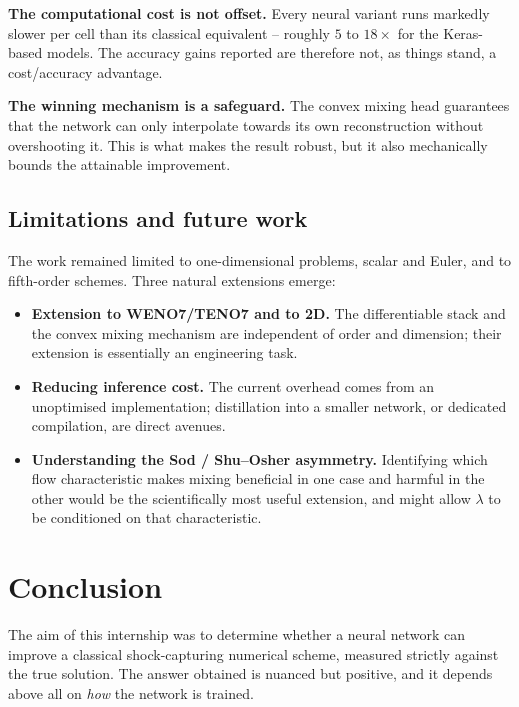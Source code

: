 \documentclass[12pt,a4paper,oneside]{report}
\begin{document}
\textbf{The computational cost is not offset.} Every neural variant runs
markedly slower per cell than its classical equivalent -- roughly $5$ to
$18\times$ for the Keras-based models. The accuracy gains reported are
therefore not, as things stand, a cost/accuracy advantage.

\textbf{The winning mechanism is a safeguard.} The convex mixing head
guarantees that the network can only interpolate towards its own reconstruction
without overshooting it. This is what makes the result robust, but it also
mechanically bounds the attainable improvement.

\section{Limitations and future work}

The work remained limited to one-dimensional problems, scalar and Euler, and to
fifth-order schemes. Three natural extensions emerge:

\begin{itemize}
  \item \textbf{Extension to WENO7/TENO7 and to 2D.} The differentiable stack
  and the convex mixing mechanism are independent of order and dimension; their
  extension is essentially an engineering task.
  \item \textbf{Reducing inference cost.} The current overhead comes from an
  unoptimised implementation; distillation into a smaller network, or dedicated
  compilation, are direct avenues.
  \item \textbf{Understanding the Sod / Shu--Osher asymmetry.} Identifying
  which flow characteristic makes mixing beneficial in one case and harmful in
  the other would be the scientifically most useful extension, and might allow
  $\lambda$ to be conditioned on that characteristic.
\end{itemize}

\chapter*{Conclusion}

The aim of this internship was to determine whether a neural network can
improve a classical shock-capturing numerical scheme, measured strictly against
the true solution. The answer obtained is nuanced but positive, and it depends
above all on \emph{how} the network is trained.
\end{document}
